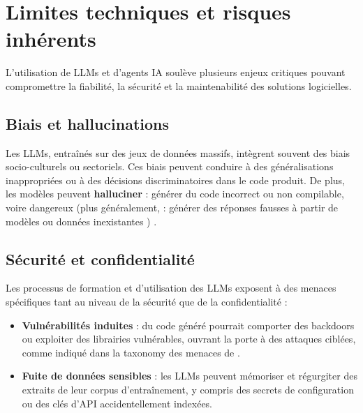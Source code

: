 \section{Limites techniques et risques inhérents}

L’utilisation de LLMs et d’agents IA soulève plusieurs enjeux critiques pouvant compromettre la fiabilité, la sécurité et la maintenabilité des solutions logicielles.

\subsection{Biais et hallucinations}
Les LLMs, entraînés sur des jeux de données massifs, intègrent souvent des biais socio-culturels ou sectoriels. Ces biais peuvent conduire à des généralisations inappropriées ou à des décisions discriminatoires dans le code produit. De plus, les modèles peuvent \textbf{halluciner} : générer du code incorrect ou non compilable, voire dangereux (plus généralement, \cite{wikiHallucinationIA} : générer des réponses fausses à partir de modèles ou données inexistantes ) \parencite{cui_risk_2024}.

%

\subsection{Sécurité et confidentialité}
Les processus de formation et d’utilisation des LLMs exposent à des menaces spécifiques tant au niveau de la sécurité que de la confidentialité :
\begin{itemize}
  \item \textbf{Vulnérabilités induites} : du code généré pourrait comporter des backdoors ou exploiter des librairies vulnérables, ouvrant la porte à des attaques ciblées, comme indiqué dans la taxonomy des menaces de \parencite{wang_unique_2024}.

  \item \textbf{Fuite de données sensibles} : les LLMs peuvent mémoriser et régurgiter des extraits de leur corpus d’entraînement, y compris des secrets de configuration ou des clés d’API accidentellement indexées.
\end{itemize}


